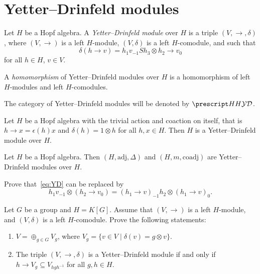 \section{Yetter--Drinfeld modules}

\begin{definition}
Let $H$ be a Hopf algebra. A \emph{Yetter--Drinfeld module} over $H$ is a
triple $(V,\rightarrow,\delta)$, where $(V,\rightarrow)$ is a left $H$-module,
$(V,\delta)$ is a left $H$-comodule, and such that 
\begin{equation}
\delta(h\rightarrow v)= h_{1}v_{-1}Sh_{3}\otimes h_{2}\rightarrow v_{0}\label{eq:YD}
\end{equation}
for all $h\in H$, $v\in V$. 
\end{definition}

\begin{definition}
A \emph{homomorphism} of Yetter--Drinfeld modules over $H$ 
is a homomorphism of left $H$-modules and left $H$-comodules. 
\end{definition}

The category of Yetter--Drinfeld
modules will be denoted by $\ydH$.

\begin{example}
Let $H$ be a Hopf algebra with the trivial action and coaction on itself, that is 
$h\rightarrow x=\epsilon(h)x$ and $\delta(h)=1\otimes h$ for all $h,x\in H$.
Then $H$ is a Yetter--Drinfeld module over $H$.
\end{example}

\begin{example}
Let $H$ be a Hopf algebra. Then $(H,\mathrm{adj},\Delta)$ and
$(H,m,\mathrm{coadj})$ are Yetter--Drinfeld modules over $H$.
\end{example}

\begin{exercise}
\label{xca:YD_condition}
Prove that~\eqref{eq:YD} can be replaced by 
\begin{equation}
\label{eq:left_left_YD_equivalent}
h_{1}v_{-1}\otimes(h_{2}\rightarrow v_{0})
=(h_{1}\rightarrow v)_{-1}h_{2}\otimes(h_{1}\rightarrow v)_{0}.
\end{equation}
\end{exercise}

\begin{exercise}
Let $G$ be a group and $H=K[G]$. Assume that
$(V,\rightarrow)$ is a left $H$-module, and $(V,\delta)$ is a left
$H$-comodule. Prove the following statements:
\begin{enumerate}
\item $V=\oplus_{g\in G}V_{g}$, where $V_{g}=\{v\in V\mid\delta(v)=g\otimes v\}$.  
\item The triple $(V,\rightarrow,\delta)$ is a Yetter--Drinfeld
module if and only if $h\rightarrow V_{g}\subseteq V_{hgh^{-1}}$ for all
$g,h\in H$.
\end{enumerate}
\end{exercise}

